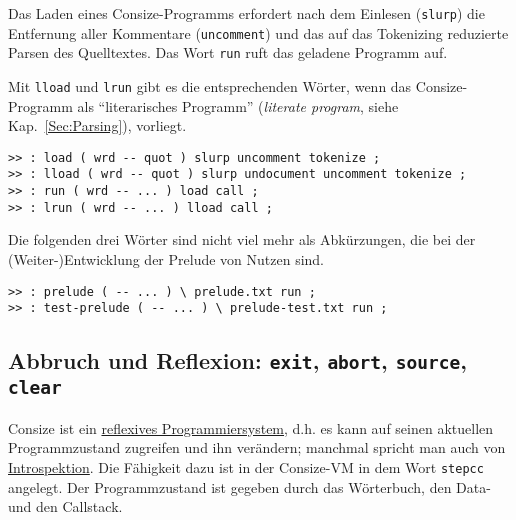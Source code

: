 %

Das Laden eines Consize-Programms erfordert nach dem Einlesen (\verb|slurp|) die Entfernung aller Kommentare (\verb|uncomment|) und das auf das Tokenizing reduzierte Parsen des Quelltextes. Das Wort \verb|run| ruft das geladene Programm auf.

Mit \verb|lload| und \verb|lrun| gibt es die entsprechenden Wörter, wenn das Consize-Programm als "`literarisches Programm"' (\emph{literate program}, siehe Kap.~\ref{Sec:Parsing}), vorliegt.

\begin{verbatim}
>> : load ( wrd -- quot ) slurp uncomment tokenize ;
>> : lload ( wrd -- quot ) slurp undocument uncomment tokenize ;
>> : run ( wrd -- ... ) load call ;
>> : lrun ( wrd -- ... ) lload call ;
\end{verbatim}

Die folgenden drei Wörter sind nicht viel mehr als Abkürzungen, die bei der (Weiter-)Entwicklung der Prelude von Nutzen sind.

\begin{verbatim}
>> : prelude ( -- ... ) \ prelude.txt run ;
>> : test-prelude ( -- ... ) \ prelude-test.txt run ;
\end{verbatim}

\subsection{Abbruch und Reflexion: \texttt{exit}, \texttt{abort}, \texttt{source}, \texttt{clear}}

Consize ist ein \href{http://de.wikipedia.org/wiki/Reflexion\_(Programmierung)}{reflexives Programmiersystem}, d.h. es kann auf seinen aktuellen Programmzustand zugreifen und ihn verändern; manchmal spricht man auch von \href{http://de.wikipedia.org/wiki/Reflexion\_(Programmierung)}{Introspektion}. Die Fähigkeit dazu ist in der Consize-VM in dem Wort \verb|stepcc| angelegt. Der Programmzustand ist gegeben durch das Wörterbuch, den Data- und den Callstack.

